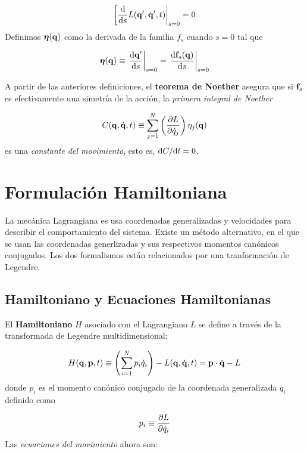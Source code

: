 \begin{equation}
	\eval[ \derivadas{}{s} L (\qn',\dot{\qn}',t) |_{s=0} = 0
\end{equation}
Definimos $\boldsymbol{\eta}(\mathbf{q})$ como la derivada de la familia $f_s$ cuando $s=0$ tal que 

\begin{equation}
	\etan (\qn) \equiv \eval{ \derivadas{\qn'}{s} }_{s=0} = \eval{ \derivadas{\fn_s(\qn)}{s} }_{s=0}
\end{equation}

\begin{teorema}
A partir de las anteriores definiciones, el \textbf{teorema de Noether} asegura que si $\mathbf{f}_s$ es efectivamente una simetría de la acción, la \textit{primera integral de Noether} 

\begin{equation}
	C(\mathbf{q},\dot{\mathbf{q}},t) \equiv \sum_{j=1}^N \left( \frac{\partial L}{\partial \dot{q}_j} \right) \eta_j (\mathbf{q}) 
\end{equation}
es una \textit{constante del movimiento}, esto es, $\mathrm{d} C / \mathrm{d} t = 0$. 
\end{teorema}

\section{Formulación Hamiltoniana}

La mecánica Lagrangiana es usa coordenadas generalizadas y velocidades para describir el comportamiento del sistema. Existe un método alternativo, en el que se usan las coordenadas generlizadas y sus respectivos momentos canónicos conjugados. Los dos formalismos están relacionados por una tranformación de Legendre.

\subsection{Hamiltoniano y Ecuaciones Hamiltonianas}

El \textbf{Hamiltoniano} $H$ asociado con el Lagrangiano $L$ se define a través de la transformada de Legendre multidimensional:

\begin{equation}
	H(\mathbf{q},\mathbf{p},t) \equiv \left( \sum_{i=1}^N p_i \dot{q}_i  \right)  - L(\mathbf{q},\dot{\mathbf{q}},t) = \mathbf{p} \cdot \dot{\mathbf{q}} - L 
\end{equation}
donde $p_i$ es el momento canónico conjugado de la coordenada generalizada $q_i$ definido como

\begin{equation}
	p_i \equiv \frac{\partial L}{\partial \dot{q}_i}
\end{equation}
Las \textit{ecuaciones del movimiento} ahora son:


